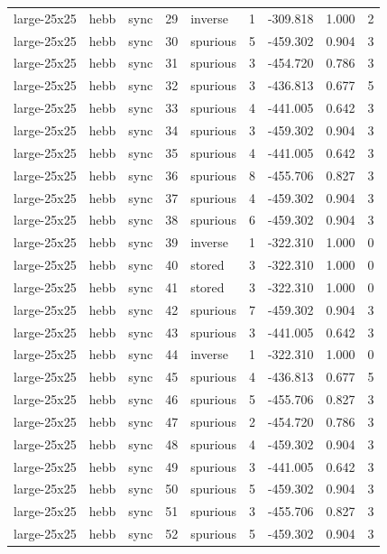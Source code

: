 \begin{tabular}{lllrlrrrr}
large-25x25 & hebb & sync & 29 & inverse & 1 & -309.818 & 1.000 & 2 \\
large-25x25 & hebb & sync & 30 & spurious & 5 & -459.302 & 0.904 & 3 \\
large-25x25 & hebb & sync & 31 & spurious & 3 & -454.720 & 0.786 & 3 \\
large-25x25 & hebb & sync & 32 & spurious & 3 & -436.813 & 0.677 & 5 \\
large-25x25 & hebb & sync & 33 & spurious & 4 & -441.005 & 0.642 & 3 \\
large-25x25 & hebb & sync & 34 & spurious & 3 & -459.302 & 0.904 & 3 \\
large-25x25 & hebb & sync & 35 & spurious & 4 & -441.005 & 0.642 & 3 \\
large-25x25 & hebb & sync & 36 & spurious & 8 & -455.706 & 0.827 & 3 \\
large-25x25 & hebb & sync & 37 & spurious & 4 & -459.302 & 0.904 & 3 \\
large-25x25 & hebb & sync & 38 & spurious & 6 & -459.302 & 0.904 & 3 \\
large-25x25 & hebb & sync & 39 & inverse & 1 & -322.310 & 1.000 & 0 \\
large-25x25 & hebb & sync & 40 & stored & 3 & -322.310 & 1.000 & 0 \\
large-25x25 & hebb & sync & 41 & stored & 3 & -322.310 & 1.000 & 0 \\
large-25x25 & hebb & sync & 42 & spurious & 7 & -459.302 & 0.904 & 3 \\
large-25x25 & hebb & sync & 43 & spurious & 3 & -441.005 & 0.642 & 3 \\
large-25x25 & hebb & sync & 44 & inverse & 1 & -322.310 & 1.000 & 0 \\
large-25x25 & hebb & sync & 45 & spurious & 4 & -436.813 & 0.677 & 5 \\
large-25x25 & hebb & sync & 46 & spurious & 5 & -455.706 & 0.827 & 3 \\
large-25x25 & hebb & sync & 47 & spurious & 2 & -454.720 & 0.786 & 3 \\
large-25x25 & hebb & sync & 48 & spurious & 4 & -459.302 & 0.904 & 3 \\
large-25x25 & hebb & sync & 49 & spurious & 3 & -441.005 & 0.642 & 3 \\
large-25x25 & hebb & sync & 50 & spurious & 5 & -459.302 & 0.904 & 3 \\
large-25x25 & hebb & sync & 51 & spurious & 3 & -455.706 & 0.827 & 3 \\
large-25x25 & hebb & sync & 52 & spurious & 5 & -459.302 & 0.904 & 3 \\

\end{tabular}
